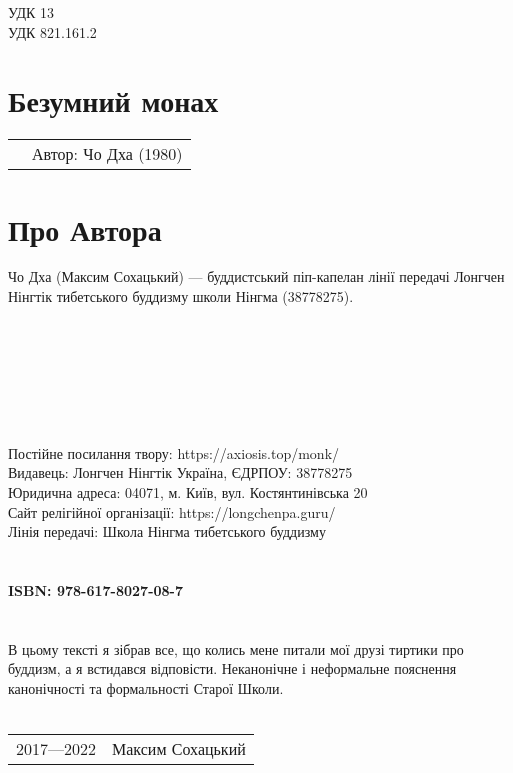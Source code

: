 \noindent УДК 13\\
\noindent УДК 821.161.2

\section*{Безумний монах \dharmachakra}

\begin{tabular}{ll}
& Автор: Чо Дха (1980)\\
\end{tabular}

\section*{Про Автора}
Чо Дха (Максим Сохацький) --- буддистський піп-капелан лінії передачі
Лонгчен Нінгтік тибетського буддизму школи Нінгма (38778275).
\\
\\
\\
\\
\\
\\
\\
\\
Постійне посилання твору: https://axiosis.top/monk/ \\
Видавець: Лонгчен Нінгтік Україна, ЄДРПОУ: 38778275 \\
Юридична адреса: 04071, м. Київ, вул. Костянтинівська 20 \\
Сайт релігійної організації: https://longchenpa.guru/ \\
Лінія передачі: Школа Нінгма тибетського буддизму \\
\\
\\
{\bf ISBN: 978-617-8027-08-7 \hspace{2em}} \\
\\
\\
\indent В цьому тексті я зібрав все, що колись мене
питали мої друзі тиртики про буддизм, а я встидався відповісти.
Неканонічне і неформальне пояснення канонічності та формальності Старої Школи.
\\
\\
\begin{tabular}{ll}
\textcopyright{} 2017---2022 & Максим Сохацький
\end{tabular}
